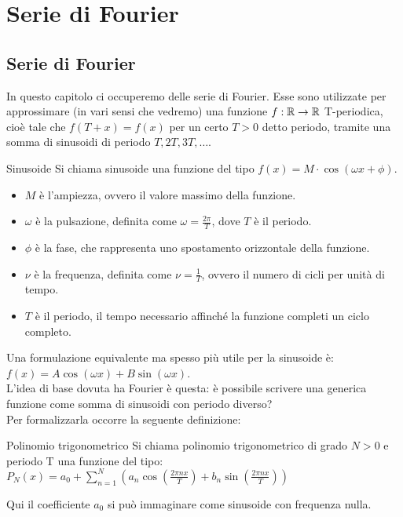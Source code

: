 \chapter{Serie di Fourier}

\section{Serie di Fourier}
In questo capitolo ci occuperemo delle serie di Fourier. Esse sono utilizzate per approssimare (in vari sensi che vedremo) una funzione $f:\mathbb{R} \to \mathbb{R}$ T-periodica, cioè tale che $f(T+x)=f(x)$ per un certo $T>0$ detto periodo, tramite una somma di sinusoidi di periodo $T, 2T, 3T, \dots$.

\begin{definizione}{Sinusoide}
  Si chiama sinusoide una funzione del tipo $f(x) = M\cdot \cos(\omega x +\phi)$.
  \begin{itemize}
    \item $M$ è l'ampiezza, ovvero il valore massimo della funzione.
    \item $\omega$ è la pulsazione, definita come $\omega = \frac{2\pi}{T}$, dove $T$ è il periodo.
    \item $\phi$ è la fase, che rappresenta uno spostamento orizzontale della funzione.
    \item $\nu$ è la frequenza, definita come $\nu = \frac{1}{T}$, ovvero il numero di cicli per unità di tempo.
    \item $T$ è il periodo, il tempo necessario affinché la funzione completi un ciclo completo.
  \end{itemize}
\end{definizione}
Una formulazione equivalente ma spesso più utile per la sinusoide è:\\
$f(x) = A\cos(\omega x) + B\sin(\omega x)$.\\

L'idea di base dovuta ha Fourier è questa: è possibile scrivere una generica funzione come somma di sinusoidi con periodo diverso?
\\
Per formalizzarla occorre la seguente definizione:
\begin{definizione}{Polinomio trigonometrico}
  Si chiama polinomio trigonometrico di grado $N>0$ e periodo T una funzione del tipo:
  $P_N(x) = a_0 + \sum_{n=1}^{N} \left( a_n \cos\left(\frac{2\pi nx}{T}\right) + b_n \sin\left(\frac{2\pi nx}{T}\right) \right)$
\end{definizione}
Qui il coefficiente $a_0$ si può immaginare come sinusoide con frequenza nulla.


